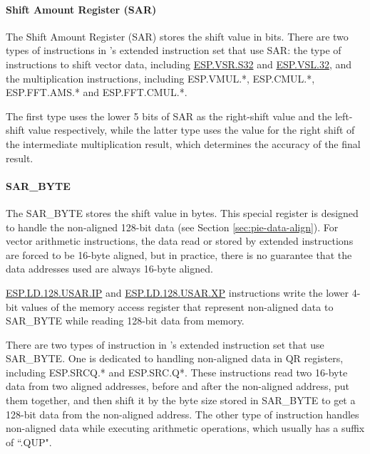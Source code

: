 \documentclass[main\_\_EN.tex]{subfiles}
\begin{document}
\paragraph{Shift Amount Register (SAR)}
The Shift Amount Register (SAR) stores the shift value in bits. There are two types of instructions in \chipname{}'s extended instruction set that use SAR: the type of instructions to shift vector data, including \hyperref[instruction:ESPVSRS32]{ESP.VSR.S32} and \hyperref[instruction:ESPVSL32]{ESP.VSL.32}, and the multiplication instructions, including ESP.VMUL.*, ESP.CMUL.*, ESP.FFT.AMS.* and ESP.FFT.CMUL.*.

The first type uses the lower 5 bits of SAR as the right-shift value and the left-shift value respectively, while the latter type uses the value for the right shift of the intermediate multiplication result, which determines the accuracy of the final result.

\paragraph{SAR\_BYTE}

The SAR\_BYTE stores the shift value in bytes. This special register is designed to handle the non-aligned 128-bit data (see Section \ref{sec:pie-data-align}). For vector arithmetic instructions, the data read or stored by extended instructions are forced to be 16-byte aligned, but in practice, there is no guarantee that the data addresses used are always 16-byte aligned.

\hyperref[instruction:ESPLD128USARIP]{ESP.LD.128.USAR.IP} and \hyperref[instruction:ESPLD128USARXP]{ESP.LD.128.USAR.XP} instructions write the lower 4-bit values of the memory access register that represent non-aligned data to SAR\_BYTE while reading 128-bit data from memory.

There are two types of instruction in \chipname{}'s extended instruction set that use SAR\_BYTE. One is dedicated to handling non-aligned data in QR registers, including ESP.SRCQ.* and ESP.SRC.Q*. These instructions read two 16-byte data from two aligned addresses, before and after the non-aligned address, put them together, and then shift it by the byte size stored in SAR\_BYTE to get a 128-bit data from the non-aligned address. The other type of instruction handles non-aligned data while executing arithmetic operations, which usually has a suffix of ``.QUP".
\end{document}
